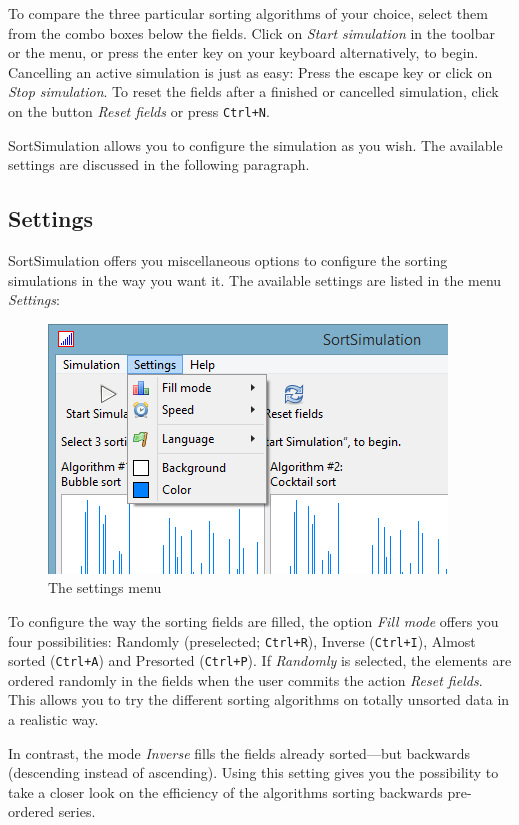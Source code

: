 \documentclass[]{pfBook}
\begin{document}
	To compare the three particular sorting algorithms of your choice, select them from the combo boxes below the fields. Click on \emph{Start simulation} in the toolbar or the menu, or press the enter key on your keyboard alternatively, to begin. Cancelling an active simulation is just as easy: Press the escape key or click on \emph{Stop simulation}. To reset the fields after a finished or cancelled simulation, click on the button \emph{Reset fields} or press \texttt{Ctrl+N}.
	
	SortSimulation allows you to configure the simulation as you wish. The available settings are discussed in the following paragraph.
	
	\subsection{Settings}
	
	SortSimulation offers you miscellaneous options to configure the sorting simulations in the way you want it. The available settings are listed in the menu \emph{Settings}:
	
	\begin{figure}[h]
		\centering
		\includegraphics[scale=0.6]{images/image1.png}
		\caption{The settings menu}
	\end{figure}
	
	To configure the way the sorting fields are filled, the option \emph{Fill mode} offers you four possibilities: Randomly (preselected; \texttt{Ctrl+R}), Inverse (\texttt{Ctrl+I}), Almost sorted (\texttt{Ctrl+A}) and Presorted (\texttt{Ctrl+P}). If \emph{Randomly} is selected, the elements are ordered randomly in the fields when the user commits the action \emph{Reset fields}. This allows you to try the different sorting algorithms on totally unsorted data in a realistic way.
	
	In contrast, the mode \emph{Inverse} fills the fields already sorted---but backwards (descending instead of ascending). Using this setting gives you the possibility to take a closer look on the efficiency of the algorithms sorting backwards pre-ordered series.
	
\end{document}
